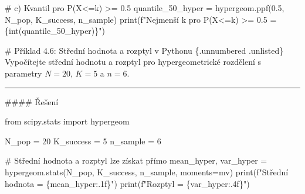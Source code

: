 \documentclass[
  czech,
  11pt,
  letterpaper,
  DIV=11,
  numbers=noendperiod]{scrreprt}
\newenvironment{Shaded}{\begin{snugshade}}{\end{snugshade}}
\newcommand{\BuiltInTok}[1]{\textcolor[rgb]{0.00,0.23,0.31}{#1}}
\newcommand{\CommentTok}[1]{\textcolor[rgb]{0.37,0.37,0.37}{#1}}
\newcommand{\DecValTok}[1]{\textcolor[rgb]{0.68,0.00,0.00}{#1}}
\newcommand{\FloatTok}[1]{\textcolor[rgb]{0.68,0.00,0.00}{#1}}
\newcommand{\ImportTok}[1]{\textcolor[rgb]{0.00,0.46,0.62}{#1}}
\newcommand{\NormalTok}[1]{\textcolor[rgb]{0.00,0.23,0.31}{#1}}
\newcommand{\OperatorTok}[1]{\textcolor[rgb]{0.37,0.37,0.37}{#1}}
\newcommand{\SpecialCharTok}[1]{\textcolor[rgb]{0.37,0.37,0.37}{#1}}
\newcommand{\SpecialStringTok}[1]{\textcolor[rgb]{0.13,0.47,0.30}{#1}}
\newcommand{\StringTok}[1]{\textcolor[rgb]{0.13,0.47,0.30}{#1}}
\begin{document}
\begin{tcolorbox}
\begin{Shaded}
\begin{Highlighting}[]
\CommentTok{\# c) Kvantil pro P(X\textless{}=k) \textgreater{}= 0.5}
\NormalTok{quantile\_50\_hyper }\OperatorTok{=}\NormalTok{ hypergeom.ppf(}\FloatTok{0.5}\NormalTok{, N\_pop, K\_success, n\_sample)}
\BuiltInTok{print}\NormalTok{(}\SpecialStringTok{f"Nejmenší k pro P(X\textless{}=k) \textgreater{}= 0.5 = }\SpecialCharTok{\{}\BuiltInTok{int}\NormalTok{(quantile\_50\_hyper)}\SpecialCharTok{\}}\SpecialStringTok{"}\NormalTok{)}
\end{Highlighting}
\end{Shaded}

\end{tcolorbox}

\begin{tcolorbox}[enhanced jigsaw, arc=.35mm, bottomrule=.15mm, bottomtitle=1mm, breakable, colback=white, colbacktitle=quarto-callout-note-color!10!white, colframe=quarto-callout-note-color-frame, coltitle=black, left=2mm, leftrule=.75mm, opacityback=0, opacitybacktitle=0.6, rightrule=.15mm, title=\textcolor{quarto-callout-note-color}{\faInfo}\hspace{0.5em}{Poznámka}, titlerule=0mm, toprule=.15mm, toptitle=1mm]

\# Příklad 4.6: Střední hodnota a rozptyl v Pythonu \{.unnumbered
.unlisted\} Vypočítejte střední hodnotu a rozptyl pro hypergeometrické
rozdělení s parametry \(N=20\), \(K=5\) a \(n=6\).

\begin{center}\rule{0.5\linewidth}{0.5pt}\end{center}

\#\#\#\# Řešení

\begin{Shaded}
\begin{Highlighting}[]
\ImportTok{from}\NormalTok{ scipy.stats }\ImportTok{import}\NormalTok{ hypergeom}

\NormalTok{N\_pop }\OperatorTok{=} \DecValTok{20}
\NormalTok{K\_success }\OperatorTok{=} \DecValTok{5}
\NormalTok{n\_sample }\OperatorTok{=} \DecValTok{6}

\CommentTok{\# Střední hodnota a rozptyl lze získat přímo}
\NormalTok{mean\_hyper, var\_hyper }\OperatorTok{=}\NormalTok{ hypergeom.stats(N\_pop, K\_success, n\_sample, moments}\OperatorTok{=}\StringTok{\textquotesingle{}mv\textquotesingle{}}\NormalTok{)}
\BuiltInTok{print}\NormalTok{(}\SpecialStringTok{f"Střední hodnota = }\SpecialCharTok{\{}\NormalTok{mean\_hyper}\SpecialCharTok{:.1f\}}\SpecialStringTok{"}\NormalTok{)}
\BuiltInTok{print}\NormalTok{(}\SpecialStringTok{f"Rozptyl = }\SpecialCharTok{\{}\NormalTok{var\_hyper}\SpecialCharTok{:.4f\}}\SpecialStringTok{"}\NormalTok{)}
\end{Highlighting}
\end{Shaded}

\end{tcolorbox}
\end{document}
